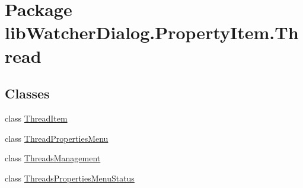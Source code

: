 \hypertarget{namespacelib_watcher_dialog_1_1_property_item_1_1_thread}{\section{Package lib\+Watcher\+Dialog.\+Property\+Item.\+Thread}
\label{namespacelib_watcher_dialog_1_1_property_item_1_1_thread}
}
\subsection*{Classes}
\begin{DoxyCompactItemize}
\item 
class \hyperlink{classlib_watcher_dialog_1_1_property_item_1_1_thread_1_1_thread_item}{Thread\+Item}
\item 
class \hyperlink{classlib_watcher_dialog_1_1_property_item_1_1_thread_1_1_thread_properties_menu}{Thread\+Properties\+Menu}
\item 
class \hyperlink{classlib_watcher_dialog_1_1_property_item_1_1_thread_1_1_threads_management}{Threads\+Management}
\item 
class \hyperlink{classlib_watcher_dialog_1_1_property_item_1_1_thread_1_1_threads_properties_menu_status}{Threads\+Properties\+Menu\+Status}
\end{DoxyCompactItemize}
